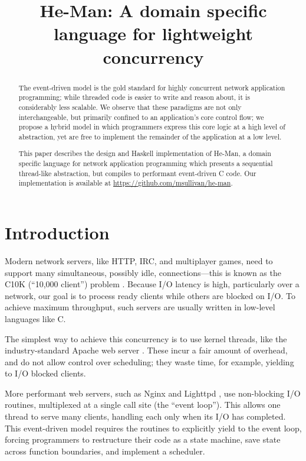 \documentclass[preprint]{sigplanconf}
\title{He-Man: A domain specific language for lightweight concurrency}
\begin{document}
\maketitle

\begin{abstract}
The event-driven model is the gold standard for highly concurrent network
application programming; while threaded code is easier to write and reason
about, it is considerably less scalable. We observe that these paradigms are not
only interchangeable, but primarily confined to an application's core control
flow; we propose a hybrid model in which programmers express this core logic at
a high level of abstraction, yet are free to implement the remainder of the
application at a low level.

This paper describes the design and Haskell implementation of He-Man, a domain
specific language for network application programming which presents a
sequential thread-like abstraction, but compiles to performant event-driven C
code. Our implementation is available at
\url{https://github.com/msullivan/he-man}. %
\end{abstract}

\section{Introduction}

Modern network servers, like HTTP, IRC, and multiplayer games, need to support
many simultaneous, possibly idle, connections---this is known as the C10K
(``10,000 client'') problem \cite{Kegel}. Because I/O latency is high,
particularly over a network, our goal is to process ready clients while others
are blocked on I/O. To achieve maximum throughput, such servers are usually
written in low-level languages like C.

The simplest way to achieve this concurrency is to use kernel threads, like the
industry-standard Apache web server \cite{Apache}. These incur a fair amount of
overhead, and do not allow control over scheduling; they waste time, for
example, yielding to I/O blocked clients.

More performant web servers, such as Nginx \cite{Nginx} and Lighttpd
\cite{Lighttpd}, use non-blocking I/O routines, multiplexed at a single call
site (the ``event loop''). This allows one thread to serve many clients,
handling each only when its I/O has completed. This event-driven model requires
the routines to explicitly yield to the event loop, forcing programmers to
restructure their code as a state machine, save state across function
boundaries, and implement a scheduler. 
\end{document}
